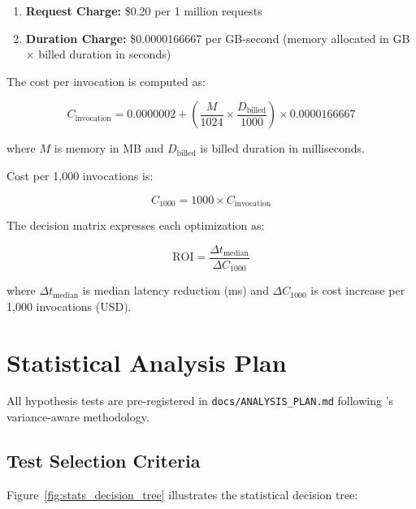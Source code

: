 \begin{enumerate}
    \item \textbf{Request Charge:} \$0.20 per 1 million requests
    \item \textbf{Duration Charge:} \$0.0000166667 per GB-second (memory allocated in GB × billed duration in seconds)
\end{enumerate}

The cost per invocation is computed as:

\begin{equation}
C_{\text{invocation}} = 0.0000002 + \left(\frac{M}{1024} \times \frac{D_{\text{billed}}}{1000}\right) \times 0.0000166667
\end{equation}

where $M$ is memory in MB and $D_{\text{billed}}$ is billed duration in milliseconds.

Cost per 1,000 invocations is:

\begin{equation}
C_{1000} = 1000 \times C_{\text{invocation}}
\end{equation}

The decision matrix expresses each optimization as:

\begin{equation}
\text{ROI} = \frac{\Delta t_{\text{median}}}{\Delta C_{1000}}
\end{equation}

where $\Delta t_{\text{median}}$ is median latency reduction (ms) and $\Delta C_{1000}$ is cost increase per 1,000 invocations (USD).

\section{Statistical Analysis Plan}

All hypothesis tests are pre-registered in \texttt{docs/ANALYSIS\_PLAN.md} following \citet{wen2025variance}'s variance-aware methodology.

\subsection{Test Selection Criteria}

Figure~\ref{fig:stats_decision_tree} illustrates the statistical decision tree:

